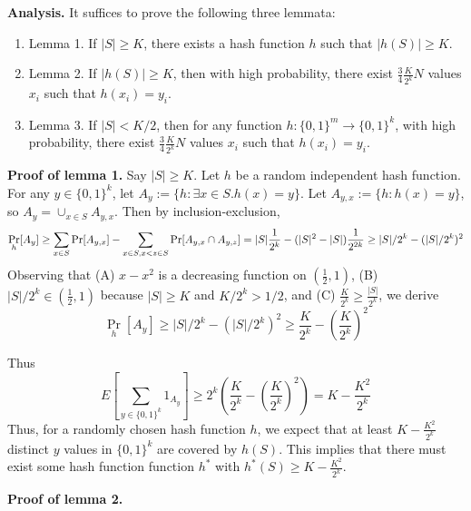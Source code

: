 \documentclass{article}
\begin{document}
\medskip
\noindent
\textbf{Analysis.}
It suffices to prove the following three lemmata:
\begin{enumerate}
	\item Lemma 1. If $|S| \geq K$, there exists a hash function $h$ such that $|h(S)| \geq K$.
	\item Lemma 2. If $|h(S)| \geq K$, then with high probability, there exist $\frac{3}{4} \frac{K}{2^k}N$ values $x_i$ such that $h(x_i) = y_i$.
	\item Lemma 3. If $|S| < K/2$, then for any function $h : \{0, 1\}^m \to \{0, 1\}^k$, with high probability, there exist $\frac{3}{4} \frac{K}{2^k}N$ values $x_i$ such that $h(x_i) = y_i$.
\end{enumerate}

\smallskip
\noindent
\textbf{Proof of lemma 1.}
Say $|S| \geq K$.
Let $h$ be a random independent hash function.
For any $y \in \{0, 1\}^k$, let $A_y := \{h : \exists x \in S . h(x) = y\}$.
Let $A_{y, x} := \{h : h(x) = y\}$, so $A_y = \cup_{x \in S} A_{y, x}$.
Then by inclusion-exclusion,
$$
\Pr_h[A_y] \geq \sum_{x \in S} \Pr[A_{y, x}] - \sum_{x\in S, x < z \in S}\Pr[A_{y, x} \cap A_{y, z}]
= |S|\frac{1}{2^k} - (|S|^2 - |S|)\frac{1}{2^{2k}} \\
\geq |S|/2^k - (|S|/2^k)^2
$$
Observing that (A) $x - x^2$ is a decreasing function on $(\frac{1}{2}, 1)$, (B) $|S|/2^k \in (\frac{1}{2}, 1)$ because $|S| \geq K$ and $K/2^k > 1/2$, and (C) $\frac{K}{2^k} \geq \frac{|S|}{2^k}$, we derive
$$
\Pr_h[A_y] \geq |S|/2^k - (|S|/2^k)^2 \geq \frac{K}{2^k} - (\frac{K}{2^k})^2
$$

Thus 
$$
E[\sum_{y \in \{0, 1\}^k}1_{A_y}] \geq 2^k(\frac{K}{2^k} - (\frac{K}{2^k})^2) = K - \frac{K^2}{2^k}
$$
Thus, for a randomly chosen hash function $h$, we expect that at least $K - \frac{K^2}{2^k}$ distinct $y$ values in $\{0, 1\}^k$ are covered by $h(S)$.
This implies that there must exist some hash function function $h^*$ with $h^*(S) \geq K - \frac{K^2}{2^k}$.

\medskip
\noindent
\textbf{Proof of lemma 2.}



\end{document}
